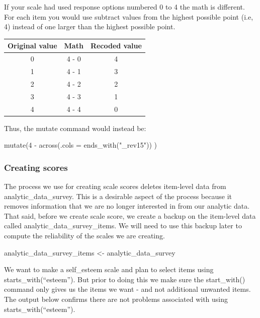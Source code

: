 \documentclass[
]{krantz}
\makeatletter
\newenvironment{Shaded}{\begin{snugshade}}{\end{snugshade}}
\newcommand{\KeywordTok}[1]{\textcolor[rgb]{0.27,0.27,0.27}{\textbf{#1}}}
\newcommand{\NormalTok}[1]{#1}
\newcommand{\OperatorTok}[1]{\textcolor[rgb]{0.43,0.43,0.43}{\textbf{#1}}}
\newcommand{\StringTok}[1]{\textcolor[rgb]{0.5,0.5,0.5}{#1}}
\newenvironment{kframe}{%
\medskip{}
\setlength{\fboxsep}{.8em}
 \def\at@end@of@kframe{}%
 \ifinner\ifhmode%
  \def\at@end@of@kframe{\end{minipage}}%
  \begin{minipage}{\columnwidth}%
 \fi\fi%
 \def\FrameCommand##1{\hskip\@totalleftmargin \hskip-\fboxsep
 \colorbox{shadecolor}{##1}\hskip-\fboxsep
     \hskip-\linewidth \hskip-\@totalleftmargin \hskip\columnwidth}%
 \MakeFramed {\advance\hsize-\width
   \@totalleftmargin\z@ \linewidth\hsize
   \@setminipage}}%
 {\par\unskip\endMakeFramed%
 \at@end@of@kframe}
\newenvironment{rmdblock}[1]
  {
  \begin{itemize}
  \renewcommand{\labelitemi}{
    \raisebox{-.7\height}[0pt][0pt]{
      {\setkeys{Gin}{width=3em,keepaspectratio}\texttt{[image: images/\#1]}}
    }
  }
  \setlength{\fboxsep}{1em}
  \begin{kframe}
  \item
  }
  {
  \end{kframe}
  \end{itemize}
  }
\newenvironment{rmdcaution}
  {\begin{rmdblock}{caution}}
  {\end{rmdblock}}
\renewenvironment{Shaded}{\begin{kframe}}{\end{kframe}}
\makeatother
\begin{document}
\begin{rmdcaution}
If your scale had used response options numbered 0 to 4 the math is different.
For each item you would use subtract values from the highest possible point (i.e, 4) instead of one larger than the highest possible point.

\begin{longtable}[]{@{}ccc@{}}
\toprule
Original value & Math & Recoded value\tabularnewline
\midrule
\endhead
0 & 4 - 0 & 4\tabularnewline
1 & 4 - 1 & 3\tabularnewline
2 & 4 - 2 & 2\tabularnewline
3 & 4 - 3 & 1\tabularnewline
4 & 4 - 4 & 0\tabularnewline
\bottomrule
\end{longtable}

Thus, the mutate command would instead be:

mutate(4 - across(.cols = ends\_with("\_rev15")) )
\end{rmdcaution}

\hypertarget{creating-scores}{%
\subsubsection{Creating scores}\label{creating-scores}}

The process we use for creating scale scores deletes item-level data from analytic\_data\_survey. This is a desirable aspect of the process because it removes information that we are no longer interested in from our analytic data. That said, before we create scale score, we create a backup on the item-level data called analytic\_data\_survey\_items. We will need to use this backup later to compute the reliability of the scales we are creating.

\begin{Shaded}
\begin{Highlighting}[]
\NormalTok{analytic_data_survey_items <-}\StringTok{ }\NormalTok{analytic_data_survey}
\end{Highlighting}
\end{Shaded}

We want to make a self\_esteem scale and plan to select items using starts\_with(``esteem''). But prior to doing this we make sure the start\_with() command only gives us the items we want - and not additional unwanted items. The output below confirms there are not problems associated with using starts\_with(``esteem'').

\begin{Shaded}
\end{Shaded}
\end{document}
